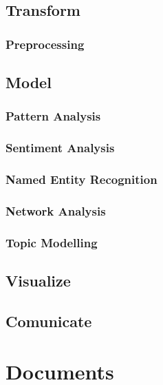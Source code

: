 \documentclass[]{book}
\begin{document}
\subsection{Transform}\label{transform}

\subsubsection{Preprocessing}\label{preprocessing}

\subsection{Model}\label{model}

\subsubsection{Pattern Analysis}\label{pattern-analysis}

\subsubsection{Sentiment Analysis}\label{sentiment-analysis}

\subsubsection{Named Entity Recognition}\label{named-entity-recognition}

\subsubsection{Network Analysis}\label{network-analysis}

\subsubsection{Topic Modelling}\label{topic-modelling}

\subsection{Visualize}\label{visualize}

\subsection{Comunicate}\label{comunicate}

\section{Documents}\label{documents}
\end{document}
